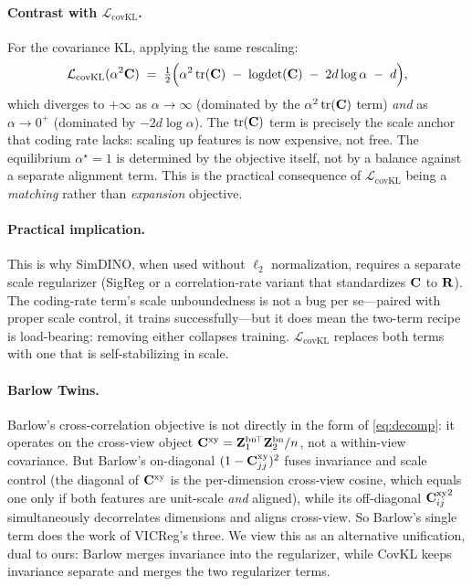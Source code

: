 \paragraph{Contrast with $\mathcal{L}_\text{covKL}$.}
For the covariance KL, applying the same rescaling:
\begin{equation}
    \mathcal{L}_\text{covKL}(\alpha^2\mathbf{C}) \;=\; \tfrac{1}{2}\Bigl(\alpha^2 \operatorname{tr}(\mathbf{C}) \;-\; \operatorname{logdet}(\mathbf{C}) \;-\; 2d\log\alpha \;-\; d\Bigr),
\end{equation}
which diverges to $+\infty$ as $\alpha \to \infty$ (dominated by the $\alpha^2 \operatorname{tr}(\mathbf{C})$ term) \emph{and} as $\alpha \to 0^+$ (dominated by $-2d\log\alpha$). The $\operatorname{tr}(\mathbf{C})$ term is precisely the scale anchor that coding rate lacks: scaling up features is now expensive, not free. The equilibrium $\alpha^\star = 1$ is determined by the objective itself, not by a balance against a separate alignment term. This is the practical consequence of $\mathcal{L}_\text{covKL}$ being a \emph{matching} rather than \emph{expansion} objective.

\paragraph{Practical implication.}
This is why SimDINO, when used without $\ell_2$ normalization, requires a separate scale regularizer (SigReg or a correlation-rate variant that standardizes $\mathbf{C}$ to $\mathbf{R}$). The coding-rate term's scale unboundedness is not a bug per se---paired with proper scale control, it trains successfully---but it does mean the two-term recipe is load-bearing: removing either collapses training. $\mathcal{L}_\text{covKL}$ replaces both terms with one that is self-stabilizing in scale.

\paragraph{Barlow Twins.}
Barlow's cross-correlation objective is not directly in the form of \eqref{eq:decomp}: it operates on the cross-view object $\mathbf{C}^\text{xy} = \mathbf{Z}_1^\text{bn}\!^\top\mathbf{Z}_2^\text{bn}/n$, not a within-view covariance. But Barlow's on-diagonal $(1 - \mathbf{C}^\text{xy}_{jj})^2$ fuses invariance and scale control (the diagonal of $\mathbf{C}^\text{xy}$ is the per-dimension cross-view cosine, which equals one only if both features are unit-scale \emph{and} aligned), while its off-diagonal ${\mathbf{C}^\text{xy}_{ij}}^2$ simultaneously decorrelates dimensions and aligns cross-view. So Barlow's single term does the work of VICReg's three. We view this as an alternative unification, dual to ours: Barlow merges invariance into the regularizer, while CovKL keeps invariance separate and merges the two regularizer terms.

